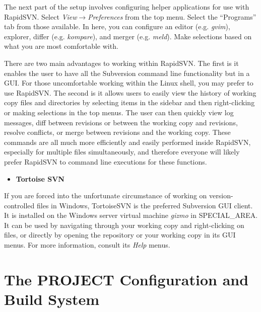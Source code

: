 \documentclass[12pt,letterpaper]{article}
\begin{document}
The next part of the setup involves configuring helper applications for use with RapidSVN.  Select \emph{View}$\rightarrow$\emph{Preferences} from the top menu.  Select the ``Programs'' tab from those available.  In here, you can configure an editor (e.g. \emph{gvim}), explorer, differ (e.g. \emph{kompare}), and merger (e.g. \emph{meld}).  Make selections based on what you are most comfortable with.

There are two main advantages to working within RapidSVN.  The first is it enables the user to have all the Subversion command line functionality but in a GUI.  For those uncomfortable working within the Linux shell, you may prefer to use RapidSVN.  The second is it allows users to easily view the history of working copy files and directories by selecting items in the sidebar and then right-clicking or making selections in the top menus.  The user can then quickly view log messages, diff between revisions or between the working copy and revisions, resolve conflicts, or merge between revisions and the working copy.  These commands are all much more efficiently and easily performed inside RapidSVN, especially for multiple files simultaneously, and therefore everyone will likely prefer RapidSVN to command line executions for these functions.

\begin{itemize}
\item \textbf{Tortoise SVN}
\end{itemize}

If you are forced into the unfortunate circumstance of working on version-controlled files in Windows, TortoiseSVN is the preferred Subversion GUI client.  It is installed on the Windows server virtual machine \emph{gizmo} in SPECIAL_AREA.  It can be used by navigating through your working copy and right-clicking on files, or directly by opening the repository or your working copy in its GUI menus.  For more information, consult its \emph{Help} menus.

\section{The PROJECT Configuration and Build System}
\end{document}
